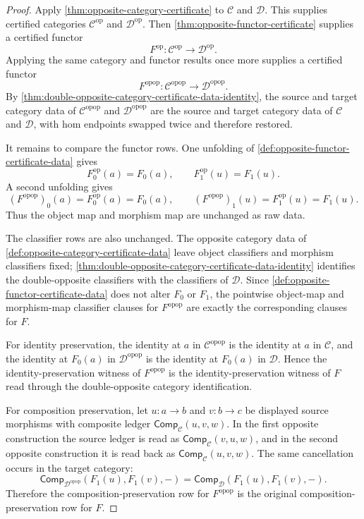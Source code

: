 \begin{proof}
Apply \autoref{thm:opposite-category-certificate} to $\mathcal C$ and $\mathcal D$. This supplies certified categories $\mathcal C^{\mathrm{op}}$ and $\mathcal D^{\mathrm{op}}$. Then \autoref{thm:opposite-functor-certificate} supplies a certified functor
$$
F^{\mathrm{op}}:\mathcal C^{\mathrm{op}}\to\mathcal D^{\mathrm{op}}.
$$
Applying the same category and functor results once more supplies a certified functor
$$
F^{\mathrm{opop}}:\mathcal C^{\mathrm{opop}}\to\mathcal D^{\mathrm{opop}}.
$$
By \autoref{thm:double-opposite-category-certificate-data-identity}, the source and target category data of $\mathcal C^{\mathrm{opop}}$ and $\mathcal D^{\mathrm{opop}}$ are the source and target category data of $\mathcal C$ and $\mathcal D$, with hom endpoints swapped twice and therefore restored.

It remains to compare the functor rows. One unfolding of \autoref{def:opposite-functor-certificate-data} gives
$$
F^{\mathrm{op}}_0(a)=F_0(a),
\qquad
F^{\mathrm{op}}_1(u)=F_1(u).
$$
A second unfolding gives
$$
(F^{\mathrm{opop}})_0(a)=F^{\mathrm{op}}_0(a)=F_0(a),
\qquad
(F^{\mathrm{opop}})_1(u)=F^{\mathrm{op}}_1(u)=F_1(u).
$$
Thus the object map and morphism map are unchanged as raw data.

The classifier rows are also unchanged. The opposite category data of \autoref{def:opposite-category-certificate-data} leave object classifiers and morphism classifiers fixed; \autoref{thm:double-opposite-category-certificate-data-identity} identifies the double-opposite classifiers with the classifiers of $\mathcal D$. Since \autoref{def:opposite-functor-certificate-data} does not alter $F_0$ or $F_1$, the pointwise object-map and morphism-map classifier clauses for $F^{\mathrm{opop}}$ are exactly the corresponding clauses for $F$.

For identity preservation, the identity at $a$ in $\mathcal C^{\mathrm{opop}}$ is the identity at $a$ in $\mathcal C$, and the identity at $F_0(a)$ in $\mathcal D^{\mathrm{opop}}$ is the identity at $F_0(a)$ in $\mathcal D$. Hence the identity-preservation witness of $F^{\mathrm{opop}}$ is the identity-preservation witness of $F$ read through the double-opposite category identification.

For composition preservation, let $u:a\to b$ and $v:b\to c$ be displayed source morphisms with composite ledger $\mathsf{Comp}_{\mathcal C}(u,v,w)$. In the first opposite construction the source ledger is read as $\mathsf{Comp}_{\mathcal C}(v,u,w)$, and in the second opposite construction it is read back as $\mathsf{Comp}_{\mathcal C}(u,v,w)$. The same cancellation occurs in the target category:
$$
\mathsf{Comp}_{\mathcal D^{\mathrm{opop}}}(F_1(u),F_1(v),-)
=
\mathsf{Comp}_{\mathcal D}(F_1(u),F_1(v),-).
$$
Therefore the composition-preservation row for $F^{\mathrm{opop}}$ is the original composition-preservation row for $F$.


\end{proof}
